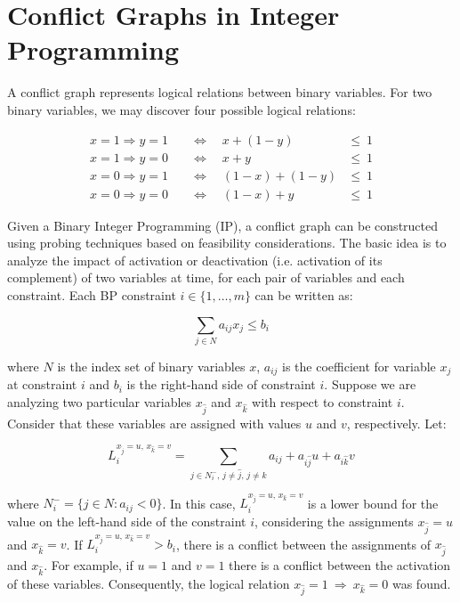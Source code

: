 \documentclass{endm}
\begin{document}
\section{Conflict Graphs in Integer Programming}\label{graph}

A conflict graph represents logical relations between binary variables. For two binary variables, we may discover four possible logical relations:

\begin{align}
x = 1 \Rightarrow y = 1 & \quad \Longleftrightarrow \quad x + (1 - y) & \leq \ 1\\
x = 1 \Rightarrow y = 0 & \quad \Longleftrightarrow \quad x + y & \leq \ 1 \\
x = 0 \Rightarrow y = 1 & \quad \Longleftrightarrow \quad (1 - x) + (1 - y) & \leq \ 1 \\
x = 0 \Rightarrow y = 0 & \quad \Longleftrightarrow \quad (1 - x) + y & \leq \ 1
\end{align}

Given a Binary Integer Programming (IP), a conflict graph can be constructed using probing techniques based on feasibility considerations. The basic idea is to analyze the impact of activation or deactivation (i.e. activation of its complement) of two variables at time, for each pair of variables and each constraint. Each BP constraint $i \in \{1,\ldots,m\}$ can be written as:

\begin{equation}
 \sum_{j \in N} a_{ij}x_{j} \leq b_{i} 
\end{equation}

\noindent where $N$ is the index set of binary variables $x$, $a_{ij}$ is the coefficient for variable $x_{j}$ at constraint $i$ and $b_{i}$ is the right-hand side of constraint $i$. Suppose we are analyzing two particular variables $x_{\hat{j}}$ and $x_{\hat{k}}$ with respect to constraint $i$. Consider that these variables are assigned with values $u$ and $v$, respectively. Let:

\begin{equation}
L_{i}^{x_{\hat{j}} = u,\, x_{\hat{k}} = v}=\sum_{j\in N_{i}^{-},\, j\neq\hat{j},\, j\neq\hat{k}}a_{ij}+a_{i\hat{j}}u+a_{i\hat{k}}v 
\end{equation}

\noindent where $N_{i}^{-} = \{j \in N : a_{ij} < 0\}$. In this case, $L_{i}^{x_{\hat{j}} = u,\, x_{\hat{k}} = v}$ is a lower bound for the value on the left-hand side  of the constraint $i$, considering the assignments $x_{\hat{j}} = u$ and $x_{\hat{k}} = v$. If $L_{i}^{x_{\hat{j}} = u,\, x_{\hat{k}} = v} > b_{i}$, there is a conflict between the assignments of $x_{\hat{j}}$ and $x_{\hat{k}}$. For example, if $u = 1$ and $v = 1$ there is a conflict between the activation of these variables. Consequently, the logical relation $x_{\hat{j}} = 1 \ \Rightarrow \ x_{\hat{k}} = 0$ was found.
\end{document}
